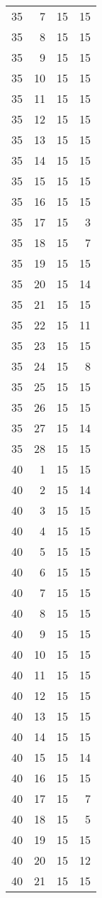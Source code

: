 \documentclass[
]{article}
\begin{document}
\begin{longtable}[]{@{}rrrr@{}}
35 & 7 & 15 & 15 \\
35 & 8 & 15 & 15 \\
35 & 9 & 15 & 15 \\
35 & 10 & 15 & 15 \\
35 & 11 & 15 & 15 \\
35 & 12 & 15 & 15 \\
35 & 13 & 15 & 15 \\
35 & 14 & 15 & 15 \\
35 & 15 & 15 & 15 \\
35 & 16 & 15 & 15 \\
35 & 17 & 15 & 3 \\
35 & 18 & 15 & 7 \\
35 & 19 & 15 & 15 \\
35 & 20 & 15 & 14 \\
35 & 21 & 15 & 15 \\
35 & 22 & 15 & 11 \\
35 & 23 & 15 & 15 \\
35 & 24 & 15 & 8 \\
35 & 25 & 15 & 15 \\
35 & 26 & 15 & 15 \\
35 & 27 & 15 & 14 \\
35 & 28 & 15 & 15 \\
40 & 1 & 15 & 15 \\
40 & 2 & 15 & 14 \\
40 & 3 & 15 & 15 \\
40 & 4 & 15 & 15 \\
40 & 5 & 15 & 15 \\
40 & 6 & 15 & 15 \\
40 & 7 & 15 & 15 \\
40 & 8 & 15 & 15 \\
40 & 9 & 15 & 15 \\
40 & 10 & 15 & 15 \\
40 & 11 & 15 & 15 \\
40 & 12 & 15 & 15 \\
40 & 13 & 15 & 15 \\
40 & 14 & 15 & 15 \\
40 & 15 & 15 & 14 \\
40 & 16 & 15 & 15 \\
40 & 17 & 15 & 7 \\
40 & 18 & 15 & 5 \\
40 & 19 & 15 & 15 \\
40 & 20 & 15 & 12 \\
40 & 21 & 15 & 15 \\

\end{longtable}
\end{document}
